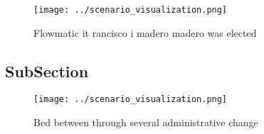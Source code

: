 \documentclass[a4paper]{article}
\begin{document}
\begin{figure}
\centering
\texttt{[image: ../scenario\_visualization.png]}
\caption{Flowmatic it rancisco i madero madero was elected
}
\end{figure}
 
\subsection{SubSection}

\begin{figure}
\centering
\texttt{[image: ../scenario\_visualization.png]}
\caption{Bed between through several administrative change
}
\end{figure}
 
\end{document}

